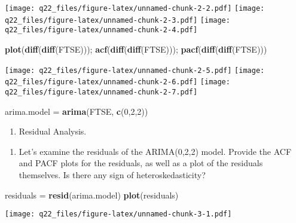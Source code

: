 \documentclass[
]{article}
\newenvironment{Shaded}{\begin{snugshade}}{\end{snugshade}}
\newcommand{\DecValTok}[1]{\textcolor[rgb]{0.00,0.00,0.81}{#1}}
\newcommand{\KeywordTok}[1]{\textcolor[rgb]{0.13,0.29,0.53}{\textbf{#1}}}
\newcommand{\NormalTok}[1]{#1}
\newcommand{\StringTok}[1]{\textcolor[rgb]{0.31,0.60,0.02}{#1}}
\providecommand{\tightlist}{%
  \setlength{\itemsep}{0pt}\setlength{\parskip}{0pt}}
\begin{document}
\texttt{[image: q22\_files/figure-latex/unnamed-chunk-2-2.pdf]}
\texttt{[image: q22\_files/figure-latex/unnamed-chunk-2-3.pdf]}
\texttt{[image: q22\_files/figure-latex/unnamed-chunk-2-4.pdf]}

\begin{Shaded}
\begin{Highlighting}[]
\KeywordTok{plot}\NormalTok{(}\KeywordTok{diff}\NormalTok{(}\KeywordTok{diff}\NormalTok{(FTSE))); }\KeywordTok{acf}\NormalTok{(}\KeywordTok{diff}\NormalTok{(}\KeywordTok{diff}\NormalTok{(FTSE))); }\KeywordTok{pacf}\NormalTok{(}\KeywordTok{diff}\NormalTok{(}\KeywordTok{diff}\NormalTok{(FTSE)))}
\end{Highlighting}
\end{Shaded}

\texttt{[image: q22\_files/figure-latex/unnamed-chunk-2-5.pdf]}
\texttt{[image: q22\_files/figure-latex/unnamed-chunk-2-6.pdf]}
\texttt{[image: q22\_files/figure-latex/unnamed-chunk-2-7.pdf]}

\begin{Shaded}
\begin{Highlighting}[]
\NormalTok{arima.model =}\StringTok{ }\KeywordTok{arima}\NormalTok{(FTSE, }\KeywordTok{c}\NormalTok{(}\DecValTok{0}\NormalTok{,}\DecValTok{2}\NormalTok{,}\DecValTok{2}\NormalTok{))}
\end{Highlighting}
\end{Shaded}

\begin{enumerate}
\def\labelenumi{\arabic{enumi}.}
\tightlist
\item
  Residual Analysis.
\end{enumerate}

\begin{enumerate}
\def\labelenumi{(\alph{enumi})}
\tightlist
\item
  Let's examine the residuals of the ARIMA(0,2,2) model. Provide the ACF
  and PACF plots for the residuals, as well as a plot of the residuals
  themselves. Is there any sign of heteroskedasticity?
\end{enumerate}

\begin{Shaded}
\begin{Highlighting}[]
\NormalTok{residuals =}\StringTok{ }\KeywordTok{resid}\NormalTok{(arima.model)}
\KeywordTok{plot}\NormalTok{(residuals)}
\end{Highlighting}
\end{Shaded}

\texttt{[image: q22\_files/figure-latex/unnamed-chunk-3-1.pdf]}
\end{document}
